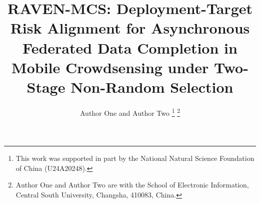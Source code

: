\documentclass[letterpaper,journal]{IEEEtran}
\begin{document}
\title{RAVEN-MCS: Deployment-Target Risk Alignment for Asynchronous Federated Data Completion in Mobile Crowdsensing under Two-Stage Non-Random Selection}

\author{Author One and Author Two%
\thanks{This work was supported in part by the National Natural Science Foundation of China (U24A20248).}%
\thanks{Author One and Author Two are with the School of Electronic Information, Central South University, Changsha, 410083, China.}%
}


\maketitle
\end{document}

